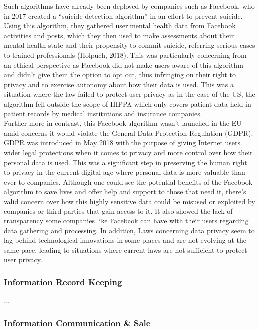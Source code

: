 \documentclass[11pt, english]{article}
\begin{document}
	Such algorithms have already been deployed by companies such as Facebook, who in 2017 created a ``suicide detection algorithm'' in an effort to prevent suicide. Using this algorithm, they gathered user mental health data from Facebook activities and posts, which they then used to make assessments about their mental health state and their propensity to commit suicide, referring serious cases to trained professionals (Holpuch, 2018). This was particularly concerning from an ethical perspective as Facebook did not make users aware of this algorithm and didn't give them the option to opt out, thus infringing on their right to privacy and to exercise autonomy about how their data is used. This was a situation where the law failed to protect user privacy as in the case of the US, the algorithm fell outside the scope of HIPPA which only covers patient data held in patient records by medical institutions and insurance companies.\\

	Further more in contrast, this Facebook algorithm wasn't launched in the EU amid concerns it would violate the General Data Protection Regulation (GDPR). GDPR was introduced in May 2018 with the purpose of giving Internet users wider legal protections when it comes to privacy and more control over how their personal data is used. This was a significant step in preserving the human right to privacy in the current digital age where personal data is more valuable than ever to companies. Although one could see the potential benefits of the Facebook algorithm to save lives and offer help and support to those that need it, there's valid concern over how this highly sensitive data could be misused or exploited by companies or third parties that gain access to it. It also showed the lack of transparency some companies like Facebook can have with their users regarding data gathering and processing. In addition, Laws concerning data privacy seem to lag behind technological innovations in some places and are not evolving at the same pace, leading to situations where current laws are not sufficient to protect user privacy.

		\subsubsection{Information Record Keeping}

	...

		\subsubsection{Information Communication \& Sale}
\end{document}
